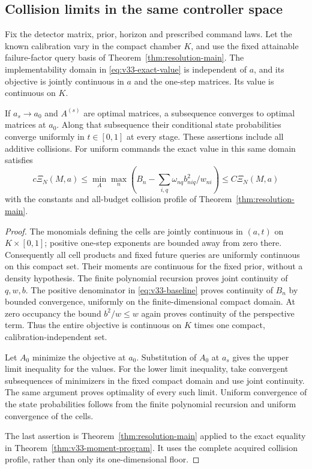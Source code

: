 \subsection{Collision limits in the same controller space}
\begin{theorem}\label{thm:v33-collision}
Fix the detector matrix, prior, horizon and prescribed command laws.
Let the known calibration vary in the compact chamber $K$, and use
the fixed attainable failure-factor query basis of
Theorem~\ref{thm:resolution-main}. The implementability domain in
\eqref{eq:v33-exact-value} is independent of $a$, and its objective
is jointly continuous in $a$ and the one-step matrices. Its value
is continuous on $K$.

If $a_s\to a_0$ and $A^{(s)}$ are optimal matrices, a subsequence
converges to optimal matrices at $a_0$. Along that subsequence their
conditional state probabilities converge uniformly in $t\in[0,1]$
at every stage. These assertions include all additive collisions.
For uniform commands the exact value in this same domain satisfies
\[
 c\Xi_N(M,a)\le
    \min_A\max_n\left(B_n-\sum_{i,q}\omega_{nq}b_{niq}^2/w_{ni}\right)
           \le C\Xi_N(M,a)
\]
with the constants and all-budget collision profile of
Theorem~\ref{thm:resolution-main}.
\end{theorem}
\begin{proof}
The monomials defining the cells are jointly continuous in $(a,t)$
on $K\times[0,1]$; positive one-step exponents are bounded away
from zero there. Consequently all cell products and fixed future
queries are uniformly continuous on this compact set. Their moments
are continuous for the fixed prior, without a density hypothesis.
The finite polynomial recursion proves joint continuity of $q,w,b$.
The positive denominator in \eqref{eq:v33-baseline} proves continuity
of $B_n$ by bounded convergence, uniformly on the finite-dimensional
compact domain. At zero occupancy the bound $b^2/w\le w$ again
proves continuity of the perspective term. Thus the entire objective
is continuous on $K$ times one compact, calibration-independent set.

Let $A_0$ minimize the objective at $a_0$. Substitution of $A_0$
at $a_s$ gives the upper limit inequality for the values. For the
lower limit inequality, take convergent subsequences of minimizers
in the fixed compact domain and use joint continuity. The same
argument proves optimality of every such limit. Uniform convergence
of the state probabilities follows from the finite polynomial
recursion and uniform convergence of the cells.

The last assertion is Theorem~\ref{thm:resolution-main} applied to
the exact equality in Theorem~\ref{thm:v33-moment-program}. It uses
the complete acquired collision profile, rather than only its
one-dimensional floor.
\end{proof}

